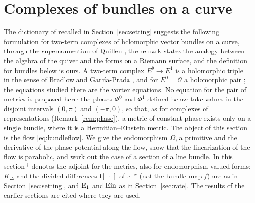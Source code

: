 \section{Complexes of bundles on a curve}\label{sec:bundles}

The dictionary of \cite[Remark~5.14]{hkkp26} recalled in
Section~\ref{sec:setting} suggests the following formulation for two-term
complexes of holomorphic vector bundles on a curve, through the
superconnection of Quillen \cite{qui85}; the remark states the analogy
between the algebra of the quiver and the forms on a Riemann surface, and
the definition for bundles below is ours. A two-term complex $E^0\to E^1$ is
a
holomorphic triple in the sense of Bradlow and Garc\'ia-Prada \cite{bg96},
and for $E^0=\mathcal O$ a holomorphic pair \cite{bra91}; the equations
studied there are the vortex equations. No equation for the pair of metrics
is proposed here: the phases $\Phi^0$ and $\Phi^1$ defined below take values
in the disjoint intervals $(0,\pi)$ and $(-\pi,0)$, so that, as for
complexes of representations (Remark~\ref{rem:phase}), a metric of constant
phase exists only on a single bundle, where it is a Hermitian--Einstein
metric. The object of this section is the flow \eqref{eq:bundleflow}. We give
the endomorphism
$\Omega$, a primitive and the derivative of the phase potential along the
flow, show that the linearization of the flow is parabolic, and work out the
case of a section of a line bundle. In this section ${}^\dagger$ denotes the
adjoint for the metrics, also for endomorphism-valued forms; $K_\Delta$ and
the divided differences $\mathsf f[\,\cdot\,]$ of $e^{-x}$ (not the bundle
map $f$) are as in Section~\ref{sec:setting}, and $\mathrm E_1$ and $\operatorname{Ein}$ as in
Section~\ref{sec:rate}. The results of the earlier sections are cited where
they are used.

